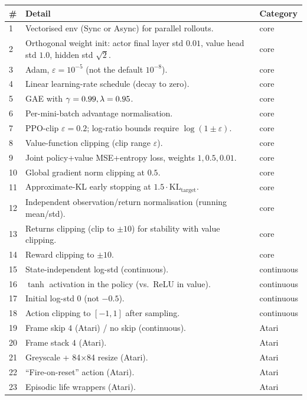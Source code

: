 \documentclass[11pt,oneside]{scrbook}
\begin{document}
\begin{table}[h!]
\centering\tiny
\begin{tabular}{lp{8.5cm}l}\toprule
\# & Detail & Category \\ \midrule
1 & Vectorised env (Sync or Async) for parallel rollouts. & core \\
2 & Orthogonal weight init: actor final layer std $0.01$, value head std $1.0$, hidden std $\sqrt{2}$. & core \\
3 & Adam, $\varepsilon=10^{-5}$ (not the default $10^{-8}$). & core \\
4 & Linear learning-rate schedule (decay to zero). & core \\
5 & GAE with $\gamma=0.99, \lambda=0.95$. & core \\
6 & Per-mini-batch advantage normalisation. & core \\
7 & PPO-clip $\varepsilon=0.2$; log-ratio bounds require $\log(1\pm\varepsilon)$. & core \\
8 & Value-function clipping (clip range $\varepsilon$). & core \\
9 & Joint policy+value MSE+entropy loss, weights $1, 0.5, 0.01$. & core \\
10 & Global gradient norm clipping at $0.5$. & core \\
11 & Approximate-KL early stopping at $1.5\cdot\mathrm{KL}_\text{target}$. & core \\
12 & Independent observation/return normalisation (running mean/std). & core \\
13 & Returns clipping (clip to $\pm 10$) for stability with value clipping. & core \\
14 & Reward clipping to $\pm 10$. & core \\
15 & State-independent log-std (continuous). & continuous \\
16 & $\tanh$ activation in the policy (vs.\ ReLU in value). & continuous \\
17 & Initial log-std $0$ (not $-0.5$). & continuous \\
18 & Action clipping to $[-1, 1]$ after sampling. & continuous \\
19 & Frame skip $4$ (Atari) / no skip (continuous). & Atari \\
20 & Frame stack $4$ (Atari). & Atari \\
21 & Greyscale + 84$\times$84 resize (Atari). & Atari \\
22 & ``Fire-on-reset'' action (Atari). & Atari \\
23 & Episodic life wrappers (Atari). & Atari \\

\end{tabular}
\end{table}
\end{document}
